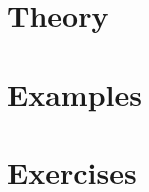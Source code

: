 



\frontmatter
   \pagestyle{empty}
   
   

   \newpage \pagestyle{fancy} \setcounter{page}{1}
   \tableofcontents

   
   
\mainmatter
   \part{Theory}
       
       
       
       
       
       
   \part{Examples}
   
   \part{Exercises}

\backmatter
    
    \printindex
    



